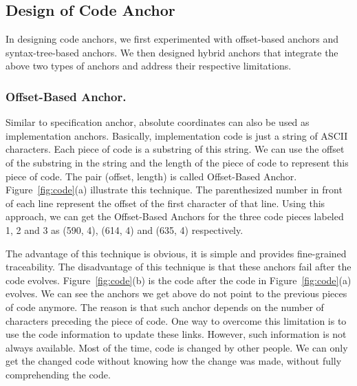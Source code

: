 \subsection{Design of Code Anchor}

In designing code anchors, we first experimented with offset-based anchors and syntax-tree-based anchors. We then designed hybrid anchors that integrate the above two types of anchors and address their respective limitations. 

\subsubsection{Offset-Based Anchor.}

Similar to specification anchor,
absolute coordinates can also be used as implementation anchors.
Basically, implementation code is just a string of ASCII characters.
Each piece of code is a substring of this string.
We can use the offset of the substring in the string and the length of the piece of code to represent this piece of code.
The pair (offset, length) is called Offset-Based Anchor.
Figure~\ref{fig:code}(a) illustrate this technique.
The parenthesized number in front of each line represent the offset of the first character of that line.
Using this approach, we can get the Offset-Based Anchors for the three code pieces labeled 1, 2 and 3 as (590, 4), (614, 4) and (635, 4) respectively.

The advantage of this technique is obvious, it is simple and provides fine-grained traceability. The disadvantage of this technique is that these anchors fail after the code evolves. Figure~\ref{fig:code}(b) is the code after the code in Figure~\ref{fig:code}(a) evolves. We can see the anchors we get above do not point to the previous pieces of code anymore. The reason is that such anchor depends on the number of characters preceding the piece of code. One way to overcome this limitation is to use the code information to update these links. However, such information is not always available. Most of the time, code is changed by other people. We can only get the changed code without knowing how the change was made, without fully comprehending the code.

